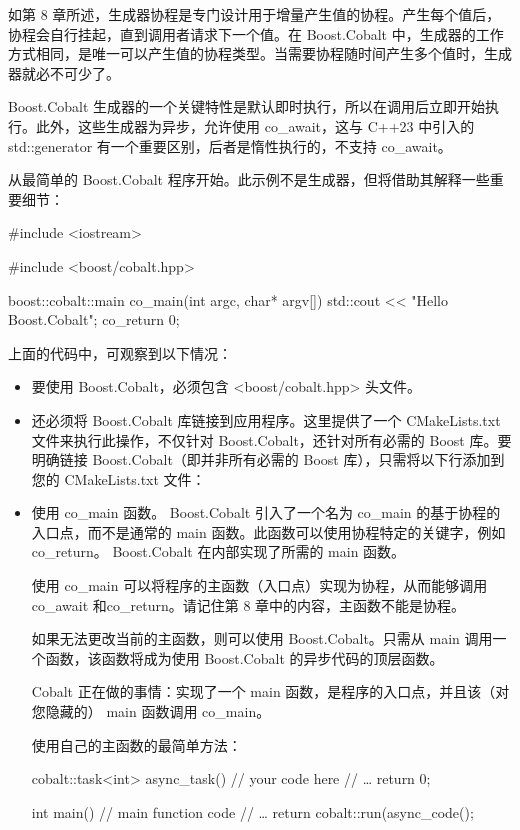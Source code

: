 
如第 8 章所述，生成器协程是专门设计用于增量产生值的协程。产生每个值后，协程会自行挂起，直到调用者请求下一个值。在 Boost.Cobalt 中，生成器的工作方式相同，是唯一可以产生值的协程类型。当需要协程随时间产生多个值时，生成器就必不可少了。

Boost.Cobalt 生成器的一个关键特性是默认即时执行，所以在调用后立即开始执行。此外，这些生成器为异步，允许使用 co\_await，这与 C++23 中引入的 std::generator 有一个重要区别，后者是惰性执行的，不支持 co\_await。


从最简单的 Boost.Cobalt 程序开始。此示例不是生成器，但将借助其解释一些重要细节：

\begin{cpp}
#include <iostream>

#include <boost/cobalt.hpp>

boost::cobalt::main co_main(int argc, char* argv[]) {
    std::cout << "Hello Boost.Cobalt\n";
    co_return 0;
}
\end{cpp}

上面的代码中，可观察到以下情况：

\begin{itemize}
\item
要使用 Boost.Cobalt，必须包含 <boost/cobalt.hpp> 头文件。

\item
还必须将 Boost.Cobalt 库链接到应用程序。这里提供了一个 CMakeLists.txt 文件来执行此操作，不仅针对 Boost.Cobalt，还针对所有必需的 Boost 库。要明确链接 Boost.Cobalt（即并非所有必需的 Boost 库），只需将以下行添加到您的 CMakeLists.txt 文件：


\item
使用 co\_main 函数。 Boost.Cobalt 引入了一个名为 co\_main 的基于协程的入口点，而不是通常的 main 函数。此函数可以使用协程特定的关键字，例如 co\_return。 Boost.Cobalt 在内部实现了所需的 main 函数。

使用 co\_main 可以将程序的主函数（入口点）实现为协程，从而能够调用 co\_await 和co\_return。请记住第 8 章中的内容，主函数不能是协程。

如果无法更改当前的主函数，则可以使用 Boost.Cobalt。只需从 main 调用一个函数，该函数将成为使用 Boost.Cobalt 的异步代码的顶层函数。

Cobalt 正在做的事情：实现了一个 main 函数，是程序的入口点，并且该（对您隐藏的） main 函数调用 co\_main。

使用自己的主函数的最简单方法：

\begin{cpp}
cobalt::task<int> async_task() {
    // your code here
    // …
    return 0;
}

int main() {
    // main function code
    // …
    return cobalt::run(async_code();
}
\end{cpp}
\end{itemize}

